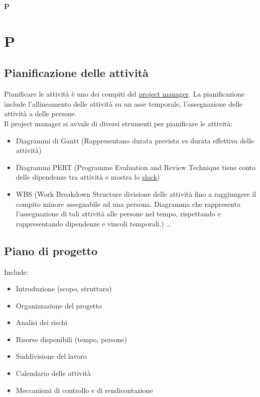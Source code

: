 	{\Huge{\textbf{P}}} \\
	\section{P}
	

	\subsection{Pianificazione delle attività}	
	\label{sec:pianificazioneattivita}
	Pianificare le attività è uno dei compiti del \hyperref[sec:projectmanager]{project manager}.
	La pianificazione include l'allineamento delle attività su un asse temporale, l'assegnazione delle attività a delle persone. \\Il project manager si avvale di diversi strumenti per pianificare le attività:  	
	\begin{itemize}  
	\item Diagrammi di Gantt (Rappresentano durata prevista vs durata effettiva delle attività)
	\item Diagrammi PERT (Programme Evaluation and Review Technique tiene conto delle dipendenze tra attività e mostra lo \hyperref[sec:slack]{slack})
	\item WBS (Work Breakdown Structure divisione delle attività fino a raggiungere il compito minore assegnabile ad una persona. Diagramma che rappresenta l'assegnazione di tali attività alle persone nel tempo, rispettando e rappresentando dipendenze e vincoli temporali.) \ldots 
	\end{itemize}	
	
	\subsection{Piano di progetto}	
	\label{sec:pianoprogetto}
	Include:
	\begin{itemize}  
	\item Introduzione (scopo, struttura)
	\item Organizzazione del progetto
	\item Analisi dei rischi
	\item Risorse disponibili (tempo, persone)
	\item Suddivisione del lavoro
	\item Calendario delle attività
	\item Meccanismi di controllo e di rendicontazione	
	\end{itemize}	
		
